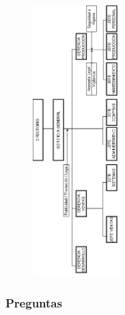 \documentclass[a4paper,10pt]{article}
\begin{document}
				\begin{figure}
				    \includegraphics[width=0.3\textwidth]{imagenes/imagenLosGringos.png}
				\end{figure}
				\newpage
	\subsubsection{Preguntas}
	
\end{document}
